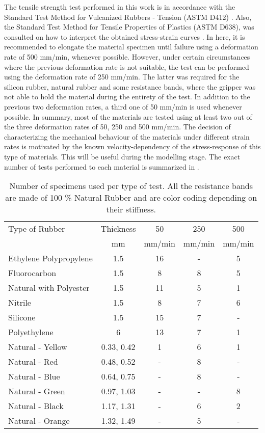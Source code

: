 The tensile strength test performed in this work is in accordance with the Standard Test Method for Vulcanized Rubbers - Tension (ASTM D412) \cite{astmd412}. Also, the Standard Test Method for Tensile Properties of Plastics (ASTM D638), was consulted on how to interpret the obtained stress-strain curves \cite{astmd638}. In here, it is recommended to elongate the material specimen until failure using a deformation rate of 500 mm/min, whenever possible. However, under certain circumstances where the previous deformation rate is not suitable, the test can be performed using the deformation rate of 250 mm/min. The latter was required for the silicon rubber, natural rubber and some resistance bands, where the gripper was not able to hold the material during the entirety of the test. In addition to the previous two deformation rates, a third one of 50 mm/min is used whenever possible. In summary, most of the materials are tested using at least two out of the three deformation rates of 50, 250 and 500 mm/min. The decision of characterizing the mechanical behaviour of the materials under different strain rates is motivated by the known velocity-dependency of the stress-response of this type of materials. This will be useful during the modelling stage. The exact number of tests performed to each material is summarized in .

\begin{table}[htb!]
    \centering
    \caption{Number of specimens used per type of test. All the resistance bands are made of 100 \% Natural Rubber and are color coding depending on their stiffness.}
    \begin{tabular}{lcccc}
    \toprule
    Type of Rubber & Thickness &  50 & 250 & 500\\
     & mm & mm/min & mm/min & mm/min \\
    \hline
    Ethylene Polypropylene   &  1.5 & 16 & - & 5\\
    Fluorocarbon              &  1.5 & 8 & 8 & 5\\
    Natural with Polyester   &  1.5 & 11 & 5 & 1\\
    Nitrile                   &  1.5 & 8 & 7 & 6\\
    Silicone                  &  1.5 & 15 & 7 & -\\
    Polyethylene              &  6 & 13 & 7 & 1\\
    \hline
    Natural - Yellow  & 0.33, 0.42 & 1 & 6 & 1\\
    Natural - Red  & 0.48, 0.52 & - & 8 & -\\
    Natural - Blue  & 0.64, 0.75 & - & 8 & -\\
    Natural - Green  & 0.97, 1.03 & - & - & 8\\
    Natural - Black  & 1.17, 1.31 & - & 6 & 2\\
    Natural - Orange  & 1.32, 1.49 & - & 5 & -\\
    \bottomrule
    \end{tabular}
    \label{tbl:tensile_tests}
\end{table}

